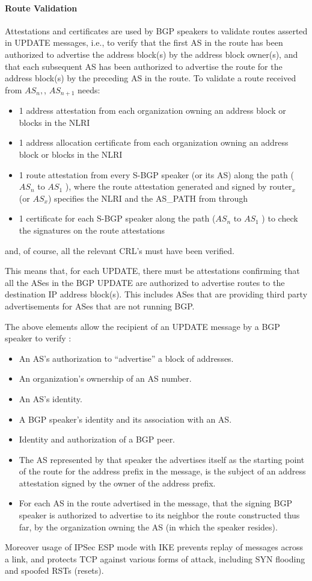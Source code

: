 \documentclass[12pt]{article}
\begin{document}
\paragraph*{Route Validation}
Attestations and certificates are used by BGP speakers to validate routes asserted in UPDATE messages, i.e., to verify that
the first AS in the route has been authorized to advertise the address block(s) by the address block owner(s), and that each subsequent AS has been authorized to advertise the route for the
address block(s) by the preceding AS in the route. To validate a
route received from $AS_n,$, $AS_{n+1}$ needs:
\begin{itemize}
\item 1 address attestation from each organization owning an
address block or blocks in the NLRI
\item 1 address allocation certificate from each organization
owning an address block or blocks in the NLRI
\item 1 route attestation from every S-BGP speaker (or its AS)
along the path ( $AS_n$ to $AS_1$ ), where the route attestation
generated and signed by router$_x$ (or $AS_x$) specifies the
NLRI and the AS\_PATH from through
\item 1 certificate for each S-BGP speaker along the path ($AS_n$
to $AS_1$ ) to check the signatures on the route attestations
\end{itemize}
and, of course, all the relevant CRL’s must have been verified.

This means that, for each UPDATE, there must be attestations
confirming that all the ASes in the BGP UPDATE are authorized
to advertise routes to the destination IP address block(s). This
includes ASes that are providing third party advertisements for
ASes that are not running BGP.

The above elements allow the recipient of an 
UPDATE message by a BGP speaker to verify :
\begin{itemize}
\item An AS's authorization to “advertise” a block of addresses.
\item An organization's ownership of an AS number. 
\item An AS's identity. 
\item A BGP speaker's identity and its association with an AS.
\item Identity and authorization of a BGP peer. 
\item The AS represented by
that speaker the advertises
itself as the starting point of the route for the address prefix in the message, is the subject of an address attestation signed by
the owner of the address prefix.
\item For each AS in the route advertised in the message, that the signing BGP speaker is authorized to advertise to its neighbor the route constructed thus far, by the organization
owning the AS (in which the speaker resides).  
\end{itemize}
Moreover usage of IPSec ESP mode with IKE prevents replay of messages across a link, and
protects TCP against various forms of attack, including SYN
flooding and spoofed RSTs (resets).
\end{document}
